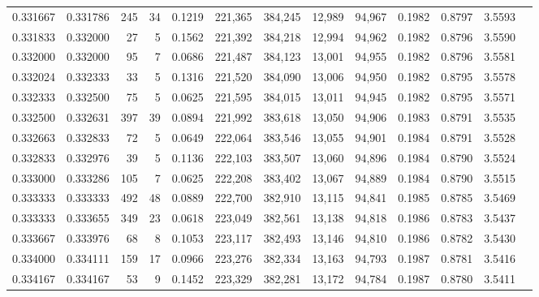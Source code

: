 \begin{tabular}{rrrrrrrrrrrrr}
0.331667 & 0.331786 &   245 &  34 &                                     0.1219 & 221,365 & 384,245 &  12,989 &  94,967 & 0.1982 & 0.8797 & 3.5593 \\
0.331833 & 0.332000 &    27 &   5 &                                     0.1562 & 221,392 & 384,218 &  12,994 &  94,962 & 0.1982 & 0.8796 & 3.5590 \\
0.332000 & 0.332000 &    95 &   7 &                                     0.0686 & 221,487 & 384,123 &  13,001 &  94,955 & 0.1982 & 0.8796 & 3.5581 \\
0.332024 & 0.332333 &    33 &   5 &                                     0.1316 & 221,520 & 384,090 &  13,006 &  94,950 & 0.1982 & 0.8795 & 3.5578 \\
0.332333 & 0.332500 &    75 &   5 &                                     0.0625 & 221,595 & 384,015 &  13,011 &  94,945 & 0.1982 & 0.8795 & 3.5571 \\
0.332500 & 0.332631 &   397 &  39 &                                     0.0894 & 221,992 & 383,618 &  13,050 &  94,906 & 0.1983 & 0.8791 & 3.5535 \\
0.332663 & 0.332833 &    72 &   5 &                                     0.0649 & 222,064 & 383,546 &  13,055 &  94,901 & 0.1984 & 0.8791 & 3.5528 \\
0.332833 & 0.332976 &    39 &   5 &                                     0.1136 & 222,103 & 383,507 &  13,060 &  94,896 & 0.1984 & 0.8790 & 3.5524 \\
0.333000 & 0.333286 &   105 &   7 &                                     0.0625 & 222,208 & 383,402 &  13,067 &  94,889 & 0.1984 & 0.8790 & 3.5515 \\
0.333333 & 0.333333 &   492 &  48 &                                     0.0889 & 222,700 & 382,910 &  13,115 &  94,841 & 0.1985 & 0.8785 & 3.5469 \\
0.333333 & 0.333655 &   349 &  23 &                                     0.0618 & 223,049 & 382,561 &  13,138 &  94,818 & 0.1986 & 0.8783 & 3.5437 \\
0.333667 & 0.333976 &    68 &   8 &                                     0.1053 & 223,117 & 382,493 &  13,146 &  94,810 & 0.1986 & 0.8782 & 3.5430 \\
0.334000 & 0.334111 &   159 &  17 &                                     0.0966 & 223,276 & 382,334 &  13,163 &  94,793 & 0.1987 & 0.8781 & 3.5416 \\
0.334167 & 0.334167 &    53 &   9 &                                     0.1452 & 223,329 & 382,281 &  13,172 &  94,784 & 0.1987 & 0.8780 & 3.5411 \\

\end{tabular}
